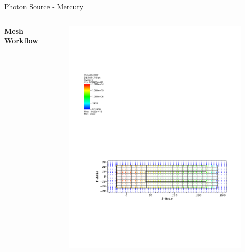 \documentclass{beamer}
\begin{document}
\begin{frame}{Photon Source - Mercury}
\begin{columns}[T]
        \textbf{Mesh Workflow}
        \begin{figure}
                \centering
                \includegraphics[scale=0.49,trim={2.5cm 6cm 1cm 16cm},clip]{figs/src_mer_mesh.pdf}
        \end{figure}

\end{columns}
\end{frame}
\end{document}
